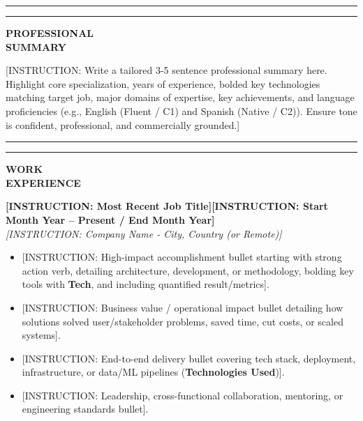 \documentclass[10pt,a4paper]{article}
\newcommand{\sectionline}{%
  \vspace{4pt}%
  \noindent%
  \begin{minipage}[b]{3.5cm}%
    \color{bannerblue}\rule{\linewidth}{4.5pt}%
  \end{minipage}%
  \hspace{0.3cm}%
  \begin{minipage}[b]{\dimexpr\textwidth-3.8cm\relax}%
    \color{dividerblue}\rule{\linewidth}{1.2pt}%
  \end{minipage}%
  \par \vspace{4pt}%
}
\newcommand{\cvblock}[2]{%
  \vspace{2pt}%
  \noindent%
  \begin{minipage}[t]{3.5cm}%
    \raggedright \bfseries \small \color{textdark} #1%
  \end{minipage}%
  \hspace{0.3cm}%
  \begin{minipage}[t]{\dimexpr\textwidth-3.8cm\relax}%
    \small \color{textdark} #2%
  \end{minipage}%
  \par \vspace{3pt}%
}
\newcommand{\jobentry}[1]{%
  \vspace{2pt}%
  \noindent%
  \begin{minipage}[t]{3.5cm}%
    \hspace{1pt}%
  \end{minipage}%
  \hspace{0.3cm}%
  \begin{minipage}[t]{\dimexpr\textwidth-3.8cm\relax}%
    \small \color{textdark} #1%
  \end{minipage}%
  \par \vspace{3pt}%
}
\begin{document}
\sectionline
\cvblock{PROFESSIONAL\\SUMMARY}{%
  [INSTRUCTION: Write a tailored 3-5 sentence professional summary here. Highlight core specialization, years of experience, bolded key technologies matching target job, major domains of expertise, key achievements, and language proficiencies (e.g., English (Fluent / C1) and Spanish (Native / C2)). Ensure tone is confident, professional, and commercially grounded.]
}

\sectionline
\cvblock{WORK\\EXPERIENCE}{%
  \textbf{[INSTRUCTION: Most Recent Job Title]}\hfill \textbf{[INSTRUCTION: Start Month Year -- Present / End Month Year]}\\
  \emph{[INSTRUCTION: Company Name - City, Country (or Remote)]}
  \begin{itemize}
    \item {[INSTRUCTION: High-impact accomplishment bullet starting with strong action verb, detailing architecture, development, or methodology, bolding key tools with \textbf{Tech}, and including quantified result/metrics].}
    \item {[INSTRUCTION: Business value / operational impact bullet detailing how solutions solved user/stakeholder problems, saved time, cut costs, or scaled systems].}
    \item {[INSTRUCTION: End-to-end delivery bullet covering tech stack, deployment, infrastructure, or data/ML pipelines (\textbf{Technologies Used})].}
    \item {[INSTRUCTION: Leadership, cross-functional collaboration, mentoring, or engineering standards bullet].}
  \end{itemize}
}
\end{document}
